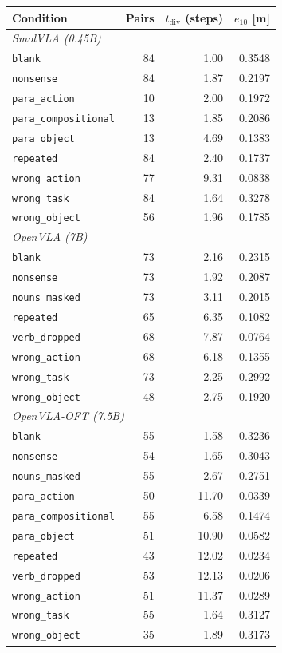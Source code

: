 \begin{tabular}{lrrr}
\toprule
\textbf{Condition} & \textbf{Pairs} & \textbf{$t_{\text{div}}$ (steps)} & \textbf{$e_{10}$ [m]} \\
\midrule
\multicolumn{4}{l}{\textit{SmolVLA (0.45B)}} \\
\texttt{blank} & 84 & 1.00 & 0.3548 \\
\texttt{nonsense} & 84 & 1.87 & 0.2197 \\
\texttt{para\_action} & 10 & 2.00 & 0.1972 \\
\texttt{para\_compositional} & 13 & 1.85 & 0.2086 \\
\texttt{para\_object} & 13 & 4.69 & 0.1383 \\
\texttt{repeated} & 84 & 2.40 & 0.1737 \\
\texttt{wrong\_action} & 77 & 9.31 & 0.0838 \\
\texttt{wrong\_task} & 84 & 1.64 & 0.3278 \\
\texttt{wrong\_object} & 56 & 1.96 & 0.1785 \\
\midrule
\multicolumn{4}{l}{\textit{OpenVLA (7B)}} \\
\texttt{blank} & 73 & 2.16 & 0.2315 \\
\texttt{nonsense} & 73 & 1.92 & 0.2087 \\
\texttt{nouns\_masked} & 73 & 3.11 & 0.2015 \\
\texttt{repeated} & 65 & 6.35 & 0.1082 \\
\texttt{verb\_dropped} & 68 & 7.87 & 0.0764 \\
\texttt{wrong\_action} & 68 & 6.18 & 0.1355 \\
\texttt{wrong\_task} & 73 & 2.25 & 0.2992 \\
\texttt{wrong\_object} & 48 & 2.75 & 0.1920 \\
\midrule
\multicolumn{4}{l}{\textit{OpenVLA-OFT (7.5B)}} \\
\texttt{blank} & 55 & 1.58 & 0.3236 \\
\texttt{nonsense} & 54 & 1.65 & 0.3043 \\
\texttt{nouns\_masked} & 55 & 2.67 & 0.2751 \\
\texttt{para\_action} & 50 & 11.70 & 0.0339 \\
\texttt{para\_compositional} & 55 & 6.58 & 0.1474 \\
\texttt{para\_object} & 51 & 10.90 & 0.0582 \\
\texttt{repeated} & 43 & 12.02 & 0.0234 \\
\texttt{verb\_dropped} & 53 & 12.13 & 0.0206 \\
\texttt{wrong\_action} & 51 & 11.37 & 0.0289 \\
\texttt{wrong\_task} & 55 & 1.64 & 0.3127 \\
\texttt{wrong\_object} & 35 & 1.89 & 0.3173 \\
\bottomrule
\end{tabular}

